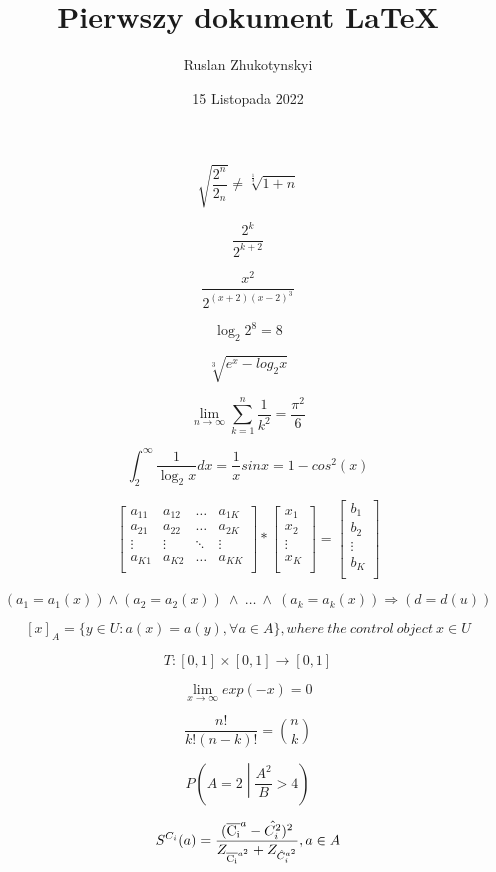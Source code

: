\documentclass[12pt, letterpaper, titlepage]{article}
\title{Pierwszy dokument LaTeX}
\author{Ruslan Zhukotynskyi}
\date{15 Listopada 2022}
\begin{document}
\maketitle

$$ \sqrt{ \frac{2^{n}}{2_n}} \neq \sqrt[\frac{1}{3}]{1+n} $$

$$ \frac{2^{k}}{2^{k+2}} $$

$$ \frac{x^{2}}{2^{(x+2)(x-2)^{3}}} $$

$$ \log_{2} 2^{8} = 8 $$

$$ \sqrt[3]{e^{x}-log_2 x} $$

$$ \lim_{n\rightarrow\infty} \sum_{k=1}^{n}\frac{1}{k^{2}} = \frac{\pi^{2}}{6} $$

$$ \int_2^{\infty}\frac{1}{\log_2 x}dx = \frac{1}{x}sin x = 1 - cos^{2}(x) $$

$$
\left[ \begin{array}{cccc}
a_{11} & a_{12} & \ldots & a_{1K} \\
a_{21} & a_{22} & \ldots & a_{2K} \\
\vdots & \vdots & \ddots & \vdots \\
a_{K1} & a_{K2} & \ldots & a_{KK} \\
\end{array} \right] *
\left[ \begin{array}{c}
x_{1} \\
x_{2} \\
\vdots \\
x_{K} \\
\end{array} \right] = 
\left[ \begin{array}{c}
b_{1} \\
b_{2} \\
\vdots \\
b_{K} \\
\end{array} \right]
$$

$$ (a_1 = a_1(x)) \wedge (a_2 = a_2(x)) \ \wedge \ \ldots \ \wedge \ (a_k = a_k(x)) \Rightarrow (d = d(u)) $$

$$ [x]_{A} = \{y \in U : a(x) = a(y), \forall a \in A \}, where\ the\ control\ object\ x \in U $$ 

$$ T : [0,1] \times [0,1] \rightarrow [0,1] $$

$$ \lim_{x \rightarrow \infty} exp(-x) = 0 $$

$$ \frac{n!}{k!(n-k)!} = {n \choose k} $$

$$ P\left(A=2\middle|\frac{A^2}{B} > 4\right) $$

$$ S^{C_i}(a) = \frac{(\overline{\rm C_i}^a-\hat{C^{2}_i})^2}{Z_{\overline{\rm C_i}^{a^2}} + Z_{\hat{C}^{a^2}_i}}, a \in A $$
\end{document}
